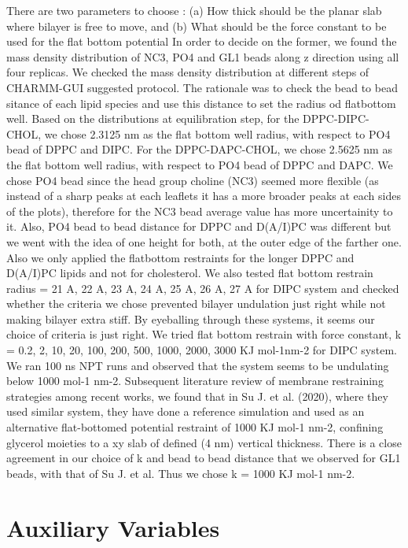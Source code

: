 \documentclass[10pt]{article}
\begin{document}
There are two parameters to choose : (a) How thick should be the planar slab where bilayer is free to move, and
(b) What should be the force constant to be used for the flat bottom potential
In order to decide on the former, we found the mass density distribution of NC3, PO4 and GL1 beads along z direction using all four replicas.
We checked the mass density distribution at different steps of CHARMM-GUI suggested protocol.
The rationale was to check the bead to bead sitance of each lipid species and use this distance to set the radius od flatbottom well.
Based on the distributions at equilibration step, for the DPPC-DIPC-CHOL, we chose 2.3125 nm as the flat bottom well radius, with respect to PO4 bead of DPPC and DIPC.
For the DPPC-DAPC-CHOL, we chose 2.5625 nm as the flat bottom well radius, with respect to PO4 bead of DPPC and DAPC.
We chose PO4 bead since the head group choline (NC3) seemed more flexible (as instead of a sharp peaks at each leaflets it has a more broader peaks at each sides of the plots), therefore for the NC3 bead average value has more uncertainity to it.
Also, PO4 bead to bead distance for DPPC and D(A/I)PC was different but we went with the idea of one height for both, at the outer edge of the farther one.
Also we only applied the flatbottom restraints for the longer DPPC and D(A/I)PC lipids and not for cholesterol.
We also tested flat bottom restrain radius = 21 A, 22 A, 23 A, 24 A, 25 A, 26 A, 27 A for DIPC system and checked whether the criteria we chose prevented bilayer undulation just right while not making bilayer extra stiff.
By eyeballing through these systems, it seems our choice of criteria is just right.
We tried flat bottom restrain with force constant, k = 0.2, 2, 10, 20, 100, 200, 500, 1000, 2000, 3000 KJ mol-1nm-2 for DIPC system.
We ran 100 ns NPT runs and observed that the system seems to be undulating below 1000 mol-1 nm-2. 
Subsequent literature review of membrane restraining strategies among recent works, we found that in Su J. et al. (2020), where they used similar system, they have done a reference simulation and used as an alternative flat-bottomed potential restraint of 1000 KJ mol-1 nm-2, confining glycerol moieties to a xy slab of defined (4 nm) vertical thickness.
There is a close agreement in our choice of k and bead to bead distance that we observed for GL1 beads, with that of Su J. et al.
Thus we chose k = 1000 KJ mol-1 nm-2.





\section*{Auxiliary Variables}
\end{document}
